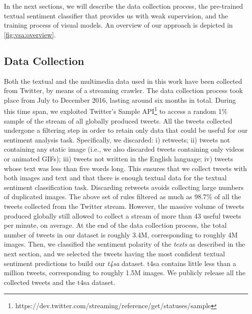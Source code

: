 In the next sections, we will describe the data collection process, the pre-trained textual sentiment classifier that provides us with weak supervision, and the training process of visual models.
An overview of our approach is depicted in \ref{fig:vsa:overview}.



\subsection{Data Collection}
\label{subsec:vsa:dataset}
Both the textual and the multimedia data used in this work have been collected from Twitter, by means of a streaming crawler.
The data collection process took place from July to December 2016, lasting around six months in total.
During this time span, we exploited Twitter's Sample API\footnote{https://dev.twitter.com/streaming/reference/get/statuses/sample} to access a random 1\% sample of the stream of all globally produced tweets.
All the tweets collected undergone a filtering step in order to retain only data that could be useful for our sentiment analysis task.
Specifically, we discarded: i) retweets; ii) tweets not containing any static image (i.e., we also discarded tweets containing only videos or animated GIFs); iii) tweets not written in the English language; iv) tweets whose text was less than five words long.
This ensures that we collect tweets with both images and text and that there is enough textual data for the textual sentiment classification task.
Discarding retweets avoids collecting large numbers of duplicated images.
The above set of rules filtered as much as 98.7\% of all the tweets collected from the Twitter stream.
However, the massive volume of tweets produced globally still allowed to collect a stream of more than 43 useful tweets per minute, on average.
At the end of the data collection process, the total number of tweets in our dataset is roughly 3.4M, corresponding to roughly 4M images.
Then, we classified the sentiment polarity of the \emph{texts} as described in the next section, and we selected the tweets having the most confident textual sentiment predictions to build our \emph{\acrfull{t4sa}} dataset.
\gls{t4sa} contains little less than a million tweets, corresponding to roughly 1.5M images.
We publicly release all the collected tweets and the \gls{t4sa} dataset.

